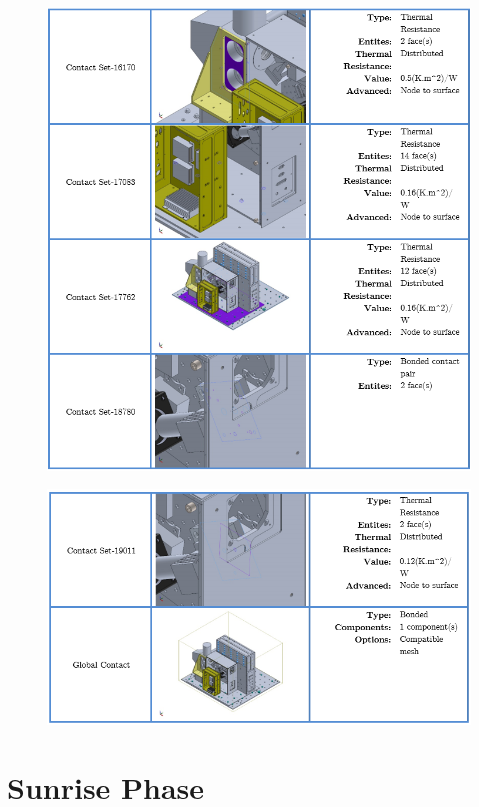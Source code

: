 \begin{figure}
    \centering
    \includegraphics[width=\textwidth]{thermal_load_images/float_TL_images/float_13.PNG}
\end{figure}

\begin{figure}
    \centering
    \includegraphics[width=\textwidth]{thermal_load_images/float_TL_images/float_14.PNG}
\end{figure}

\clearpage
\section{Sunrise Phase}

